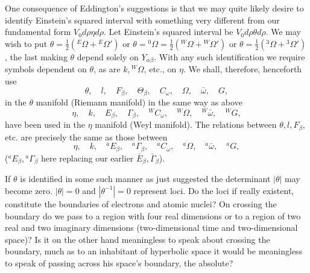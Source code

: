 \documentclass[11pt]{article}
\begin{document}
\indent One consequence of Eddington's suggestions is that we may quite likely desire to identify Einstein's squared interval with something very different from our fundamental form $V_0d\rho\eta d\rho$. Let Einstein's squared interval be $V_0d\rho\theta d\rho$. We may wish to put $\theta=\tfrac12({}^E\Omega+{}^E\Omega')$ or $\theta={}^0\Omega=\tfrac12({}^W\Omega+{}^W\Omega')$ or $\theta=\tfrac12({}^3\Omega+{}^3\Omega')$, the last making $\theta$ depend solely on $Y_{\alpha\beta}$. With any such identification we require symbols dependent on $\theta$, as are $k,{}^W\Omega$, etc., on $\eta$. We shall, therefore, henceforth use
\[
\theta,\quad l,\quad F_\beta,\quad \Theta_\beta,\quad C_\omega,\quad \Omega,\quad \bar\omega,\quad G,
\]
in the $\theta$ manifold (Riemann manifold) in the same way as above
\[
\eta,\quad k,\quad E_\beta,\quad \Gamma_\beta,\quad {}^W C_\omega,\quad {}^W\Omega,\quad {}^W\bar\omega,\quad {}^W G,
\]
have been used in the $\eta$ manifold (Weyl manifold). The relations between $\theta,l,F_\beta$, etc. are precisely the same as those between
\[
\eta,\quad k,\quad {}^aE_\beta,\quad {}^a\Gamma_\beta,\quad {}^aC_\omega,\quad {}^a\Omega,\quad {}^a\bar\omega,\quad {}^aG,
\]
(${}^aE_\beta,{}^a\Gamma_\beta$ here replacing our earlier $\bar E_\beta,\bar\Gamma_\beta$).

\indent If $\theta$ is identified in some such manner as just suggested the determinant $|\theta|$ may become zero. $|\theta|=0$ and $|\theta^{-1}|=0$ represent loci. Do the loci if really existent, constitute the boundaries of electrons and atomic nuclei? On crossing the boundary do we pass to a region with four real dimensions or to a region of two real and two imaginary dimensions (two-dimensional time and two-dimensional space)? Is it on the other hand meaningless to speak about crossing the boundary, much as to an inhabitant of hyperbolic space it would be meaningless to speak of passing across his space's boundary, the absolute?
\end{document}
